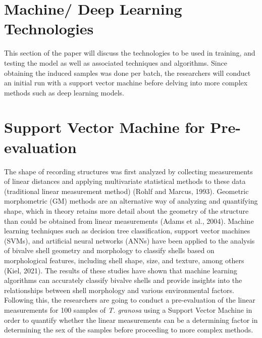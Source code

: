 \section{Machine/ Deep Learning Technologies}
This section of the paper will discuss the technologies to be used in training, and testing the model as well as associated techniques and algorithms.  Since obtaining the induced samples was done per batch, the researchers will conduct an initial run with a support vector machine before delving into more complex methods such as deep learning models. 

\section{Support Vector Machine for Pre-evaluation }
The shape of recording structures was first analyzed by collecting measurements of linear distances and applying multivariate statistical methods to these data (traditional linear measurement method) (Rohlf and Marcus, 1993). Geometric morphometric (GM) methods are an alternative way of analyzing and quantifying shape, which in theory retains more detail about the geometry of the structure than could be obtained from linear measurements (Adams et al., 2004). Machine learning techniques such as decision tree classification, support vector machines (SVMs), and artificial neural networks (ANNs) have been applied to the analysis of bivalve shell geometry and morphology to classify shells based on morphological features, including shell shape, size, and texture, among others (Kiel, 2021). The results of these studies have shown that machine learning algorithms can accurately classify bivalve shells and provide insights into the relationships between shell morphology and various environmental factors.
Following this, the researchers are going to conduct a pre-evaluation of the linear measurements for 100 samples of \textit{T. granosa} using a Support Vector Machine in order to quantify whether the linear measurements can be a determining factor in determining the sex of the samples before proceeding to more complex methods. 

